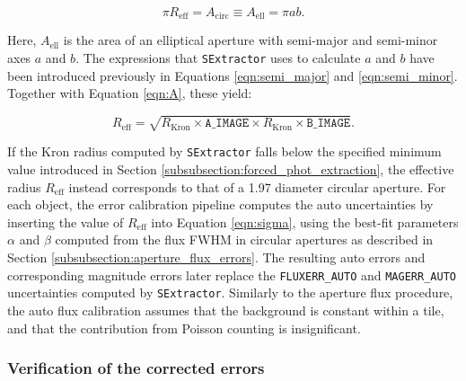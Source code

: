 \begin{equation}
    \pi R_{\mathrm{eff}} = A_{\mathrm{circ}} \equiv A_{\mathrm{ell}} = \pi a b. \label{eqn:A}
\end{equation}

\noindent Here, $A_{\mathrm{ell}}$ is the area of an elliptical aperture with semi-major and semi-minor axes $a$ and $b$. The expressions that \texttt{SExtractor} uses to calculate $a$ and $b$ have been introduced previously in Equations \ref{eqn:semi_major} and \ref{eqn:semi_minor}. Together with Equation \ref{eqn:A}, these yield:

\begin{equation}
R_{\mathrm{eff}} = \sqrt{R_{\mathrm{Kron}} \times \texttt{A\_IMAGE} \times R_{\mathrm{Kron}} \times \texttt{B\_IMAGE}}. \label{eqn:r_eff}
\end{equation}

\noindent If the Kron radius computed by \texttt{SExtractor} falls below the specified minimum value introduced in Section \ref{subsubsection:forced_phot_extraction}, the effective radius $R_{\mathrm{eff}}$ instead corresponds to that of a \SI{1.97}{\arcsec} diameter circular aperture. For each object, the error calibration pipeline computes the auto uncertainties by inserting the value of $R_{\mathrm{eff}}$ into Equation \ref{eqn:sigma}, using the best-fit parameters $\alpha$ and $\beta$ computed from the flux FWHM in circular apertures as described in Section \ref{subsubsection:aperture_flux_errors}. The resulting auto errors and corresponding magnitude errors later replace the \texttt{FLUXERR\_AUTO} and \texttt{MAGERR\_AUTO} uncertainties computed by \texttt{SExtractor}. Similarly to the aperture flux procedure, the auto flux calibration assumes that the background is constant within a tile, and that the contribution from Poisson counting is insignificant. \par 



\subsubsection{Verification of the corrected errors}\label{subsubsection:error_discussion}


